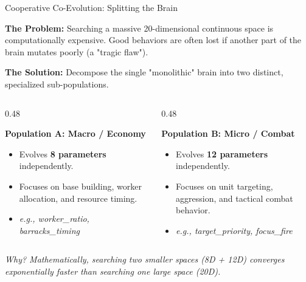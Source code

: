 \documentclass[aspectratio=169, 10pt]{beamer}
\begin{document}
\begin{frame}{Cooperative Co-Evolution: Splitting the Brain}

\textbf{The Problem:} Searching a massive 20-dimensional continuous space is computationally expensive. Good behaviors are often lost if another part of the brain mutates poorly (a "tragic flaw").

\vspace{0.3cm}
\textbf{The Solution:} Decompose the single "monolithic" brain into two distinct, specialized sub-populations. 

\vspace{0.4cm}
\begin{columns}[T]
    \begin{column}{0.48\textwidth}
        \begin{block}{\textbf{\textcolor{macroBlue}{Population A: Macro / Economy}}}
            \begin{itemize}
                \item Evolves \textbf{8 parameters} independently.
                \item Focuses on base building, worker allocation, and resource timing.
                \item \textit{e.g., worker\_ratio, barracks\_timing}
            \end{itemize}
        \end{block}
    \end{column}
    
    \begin{column}{0.48\textwidth}
        \begin{block}{\textbf{\textcolor{microOrange}{Population B: Micro / Combat}}}
            \begin{itemize}
                \item Evolves \textbf{12 parameters} independently.
                \item Focuses on unit targeting, aggression, and tactical combat behavior.
                \item \textit{e.g., target\_priority, focus\_fire}
            \end{itemize}
        \end{block}
    \end{column}
\end{columns}

\vspace{0.4cm}
\textit{Why? Mathematically, searching two smaller spaces (8D + 12D) converges exponentially faster than searching one large space (20D).}

\end{frame}
\end{document}
